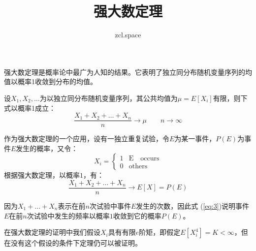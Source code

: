 \documentclass[10pt,a4paper,UTF8]{article}
\author{zcl.space}
\date{}
\title{强大数定理}
\begin{document}
\maketitle
\tableofcontents
{}
强大数定理是概率论中最广为人知的结果。它表明了独立同分布随机变量序列的均值以概率1收敛到分布的均值。

\begin{tikztheorem}
设\(X_{1},X_{2},\ldots\)为以独立同分布随机变量序列，其公共均值为\(\mu = E[X_{i}]\)有限，则下式以概率1成立：
\begin{equation}
\label{eq:1}
\frac{X_{1} + X_{2} + \ldots +X_{n}}{n} \to \mu \qquad n\to \infty
\end{equation}
\end{tikztheorem}
作为强大数定理的一个应用，设有一独立重复试验，令\(E\)为某一事件，\(P(E)\)为事件\(E\)发生的概率，又令：
\begin{equation}
\label{eq:2}
X_{i} =
\begin{cases}
1 & \mathrm{E\quad occurs} \\
0 & \mathrm{others}
\end{cases}
\end{equation}
根据强大数定理，以概率\(1\)，有：
\begin{equation}
\label{eq:3}
\frac{X_{1} + X_{2} + \ldots +X_{n}}{n} \to E[X] = P(E)
\end{equation}

因为\(X_{1}+\ldots +X_{n}\)表示在前\(n\)次试验中事件\(E\)发生的次数，因此式 (\ref{eq:3})说明事件\(E\)在前\(n\)次试验中发生的频率以概率\(1\)收敛到它的概率\(P(E)\)。

在强大数定理的证明中我们假设\(X_{i}\)具有有限\(e\)阶矩，即假定\(E[X_{i}^{4}] = K < \infty\)，但在没有这个假设的条件下定理仍可以被证明。
\end{document}
